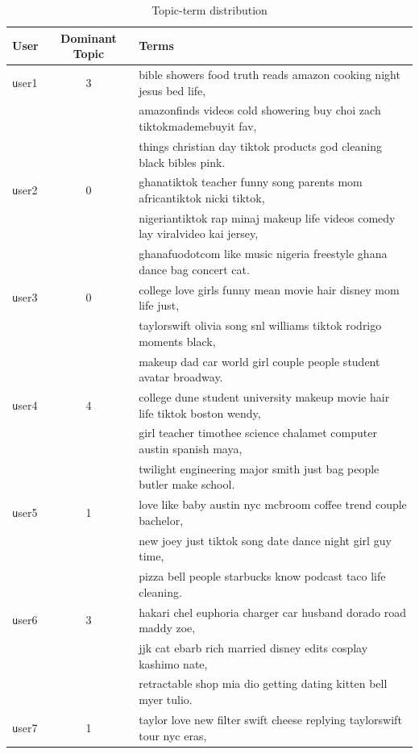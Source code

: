 \documentclass[acmtog]{acmart}
\begin{document}
\begin{table}[ht]
  \caption{Topic-term distribution}
  \label{tab:context}
  \begin{tabular}{lcl}
    \toprule
     User & Dominant Topic & Terms\\
    \midrule
    \texttt user1 & 3 & bible showers food truth reads amazon cooking night jesus bed life,\\
    \texttt & & amazonfinds videos cold showering buy choi zach tiktokmademebuyit fav,\\
    \texttt & & things christian day tiktok products god cleaning black bibles pink. \\    
    \texttt user2 & 0 & ghanatiktok teacher funny song parents mom africantiktok nicki tiktok, \\
    \texttt &&  nigeriantiktok rap minaj makeup life videos comedy lay viralvideo kai jersey, \\
    \texttt && ghanafuodotcom like music nigeria freestyle ghana dance bag concert cat. \\
    \texttt user3 & 0 & college love girls funny mean movie hair disney mom life just, \\
    \texttt && taylorswift olivia song snl williams tiktok rodrigo moments black, \\
    \texttt && makeup dad car world girl couple people student avatar broadway. \\
    \texttt user4 & 4 & college dune student university makeup movie hair life tiktok boston wendy, \\
    \texttt && girl teacher timothee science chalamet computer austin spanish maya, \\
    \texttt && twilight engineering major smith just bag people butler make school. \\
    \texttt user5 & 1 & love like baby austin nyc mcbroom coffee trend couple bachelor, \\
    \texttt && new joey just tiktok song date dance night girl guy time, \\
    \texttt && pizza bell people starbucks know podcast taco life cleaning. \\
    \texttt user6 & 3 & hakari chel euphoria charger car husband dorado road maddy zoe, \\
    \texttt && jjk cat ebarb rich married disney edits cosplay kashimo nate, \\
    \texttt && retractable shop mia dio getting dating kitten bell myer tulio. \\
    \texttt user7 & 1 & taylor love new filter swift cheese replying taylorswift tour nyc eras, \\

\end{tabular}
\end{table}
\end{document}
